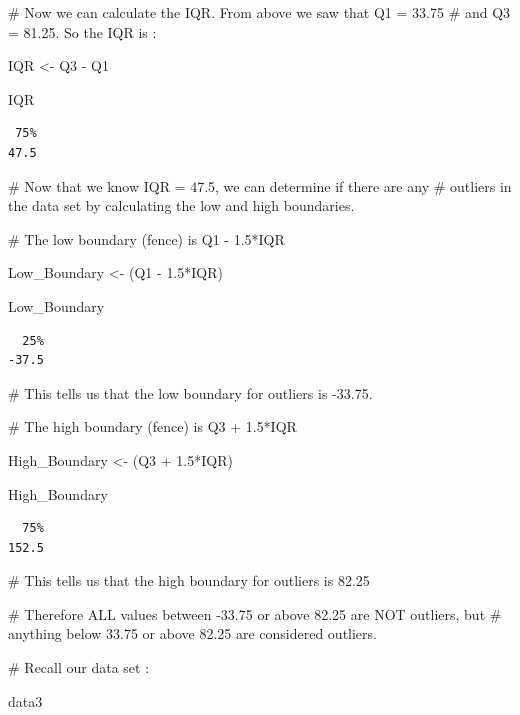 \documentclass[
  letterpaper,
  DIV=11,
  numbers=noendperiod]{scrreprt}
\newenvironment{Shaded}{\begin{snugshade}}{\end{snugshade}}
\newcommand{\CommentTok}[1]{\textcolor[rgb]{0.37,0.37,0.37}{#1}}
\newcommand{\FloatTok}[1]{\textcolor[rgb]{0.68,0.00,0.00}{#1}}
\newcommand{\NormalTok}[1]{\textcolor[rgb]{0.00,0.23,0.31}{#1}}
\newcommand{\OtherTok}[1]{\textcolor[rgb]{0.00,0.23,0.31}{#1}}
\newcommand{\SpecialCharTok}[1]{\textcolor[rgb]{0.37,0.37,0.37}{#1}}
\begin{document}
\begin{Shaded}
\begin{Highlighting}[]
\CommentTok{\# Now we can calculate the IQR. From above we saw that Q1 = 33.75 }
\CommentTok{\# and Q3 = 81.25. So the IQR is :}

\NormalTok{IQR }\OtherTok{\textless{}{-}}\NormalTok{ Q3 }\SpecialCharTok{{-}}\NormalTok{ Q1}

\NormalTok{IQR}
\end{Highlighting}
\end{Shaded}

\begin{verbatim}
 75% 
47.5 
\end{verbatim}

\begin{Shaded}
\begin{Highlighting}[]
\CommentTok{\# Now that we know IQR = 47.5, we can determine if there are any }
\CommentTok{\# outliers in the data set by calculating the low and high boundaries.}

\CommentTok{\# The low boundary (fence) is Q1 {-} 1.5*IQR}

\NormalTok{Low\_Boundary }\OtherTok{\textless{}{-}}\NormalTok{ (Q1 }\SpecialCharTok{{-}} \FloatTok{1.5}\SpecialCharTok{*}\NormalTok{IQR)}

\NormalTok{Low\_Boundary}
\end{Highlighting}
\end{Shaded}

\begin{verbatim}
  25% 
-37.5 
\end{verbatim}

\begin{Shaded}
\begin{Highlighting}[]
\CommentTok{\# This tells us that the low boundary for outliers is {-}33.75.}

\CommentTok{\# The high boundary (fence) is Q3 + 1.5*IQR}

\NormalTok{High\_Boundary }\OtherTok{\textless{}{-}}\NormalTok{ (Q3 }\SpecialCharTok{+} \FloatTok{1.5}\SpecialCharTok{*}\NormalTok{IQR)}

\NormalTok{High\_Boundary}
\end{Highlighting}
\end{Shaded}

\begin{verbatim}
  75% 
152.5 
\end{verbatim}

\begin{Shaded}
\begin{Highlighting}[]
\CommentTok{\# This tells us that the high boundary for outliers is 82.25}

\CommentTok{\# Therefore ALL values between {-}33.75 or above 82.25 are NOT outliers, but }
\CommentTok{\# anything below 33.75 or above 82.25 are considered outliers.}

\CommentTok{\# Recall our data set : }

\NormalTok{data3}
\end{Highlighting}
\end{Shaded}
\end{document}
